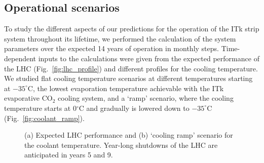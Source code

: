 
\subsection{Operational scenarios}\label{sec:opscenarios}
To study the different aspects of our predictions for the operation of the ITk strip system throughout its lifetime, we performed the calculation of the system parameters over the expected 14 years of operation in monthly steps. Time-dependent inputs to the calculations were given from the expected performance of the LHC (Fig.~\ref{fig:lhc_profile}) and different profiles for the cooling temperature. We studied flat cooling temperature scenarios at different temperatures starting at $-35^\circ$C, the lowest evaporation temperature achievable with the ITk evaporative CO$_2$ cooling system, and a `ramp' scenario, where the cooling temperature starts at 0$^\circ$C and gradually is lowered down to $-35^\circ$C (Fig.~\ref{fig:coolant_ramp}).

\begin{figure}[ht]
\centering
{}
\caption{(a) Expected LHC performance and (b) `cooling ramp' scenario for the coolant temperature. Year-long shutdowns of the LHC are anticipated in years 5 and 9.}
\label{fig:opscenarios}
\end{figure}

